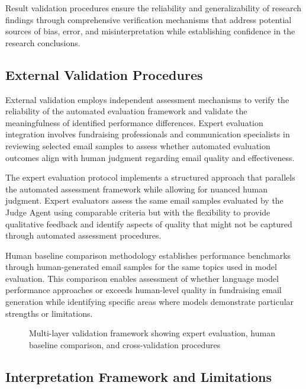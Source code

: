 Result validation procedures ensure the reliability and generalizability of research findings through comprehensive verification mechanisms that address potential sources of bias, error, and misinterpretation while establishing confidence in the research conclusions.

\subsection{External Validation Procedures}

External validation employs independent assessment mechanisms to verify the reliability of the automated evaluation framework and validate the meaningfulness of identified performance differences. Expert evaluation integration involves fundraising professionals and communication specialists in reviewing selected email samples to assess whether automated evaluation outcomes align with human judgment regarding email quality and effectiveness.

The expert evaluation protocol implements a structured approach that parallels the automated assessment framework while allowing for nuanced human judgment. Expert evaluators assess the same email samples evaluated by the Judge Agent using comparable criteria but with the flexibility to provide qualitative feedback and identify aspects of quality that might not be captured through automated assessment procedures.

Human baseline comparison methodology establishes performance benchmarks through human-generated email samples for the same topics used in model evaluation. This comparison enables assessment of whether language model performance approaches or exceeds human-level quality in fundraising email generation while identifying specific areas where models demonstrate particular strengths or limitations.

\begin{figure}[htbp]
    \centering
    \caption{Multi-layer validation framework showing expert evaluation, human baseline comparison, and cross-validation procedures}
    \label{fig:validation-framework}
\end{figure}

\subsection{Interpretation Framework and Limitations}

